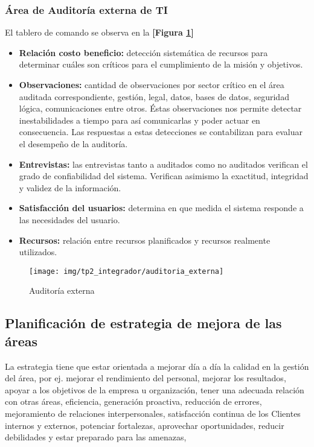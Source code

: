     \subsubsection{Área de Auditoría externa de TI}
   	    El tablero de comando se observa en la \textbf{[Figura \ref{audit_externa}]}
    	\begin{itemize}
        	\item\textbf{Relación costo beneficio: }detección sistemática de recursos para determinar cuáles son críticos para el cumplimiento de la misión y objetivos.
            \item\textbf{Observaciones: } cantidad de observaciones por sector crítico en el área auditada correspondiente, gestión, legal, datos, bases de datos, seguridad lógica, comunicaciones entre otros. Éstas observaciones nos permite detectar inestabilidades a tiempo para así comunicarlas y poder actuar en consecuencia. Las respuestas a estas detecciones se contabilizan para evaluar el desempeño de la auditoría.
            \item\textbf{Entrevistas: } las entrevistas tanto a auditados como no auditados verifican el grado de confiabilidad del sistema. Verifican asimismo la exactitud, integridad y validez de la información.
			\item\textbf{Satisfacción del usuarios: } determina en que medida el sistema responde a las necesidades del usuario.
            \item\textbf{Recursos: } relación entre recursos planificados y recursos realmente utilizados.
		\end{itemize}    
    
    \begin{figure}[h]
	  \centering
  	  \texttt{[image: img/tp2\_integrador/auditoria\_externa]}
      \label{audit_externa}
      \caption{Auditoría externa}
	\end{figure}
    
    \subsection{Planificación de estrategia de mejora de las áreas}
    La estrategia tiene que estar orientada a mejorar día a día la calidad en la gestión del área, por ej. mejorar el rendimiento del personal, mejorar los resultados, apoyar a los objetivos de la empresa u organización, tener una adecuada relación con otras áreas,  eficiencia, generación proactiva, reducción de errores, mejoramiento de relaciones interpersonales, satisfacción continua de los Clientes internos y externos, potenciar fortalezas, aprovechar oportunidades, reducir debilidades y estar preparado para las amenazas, 

